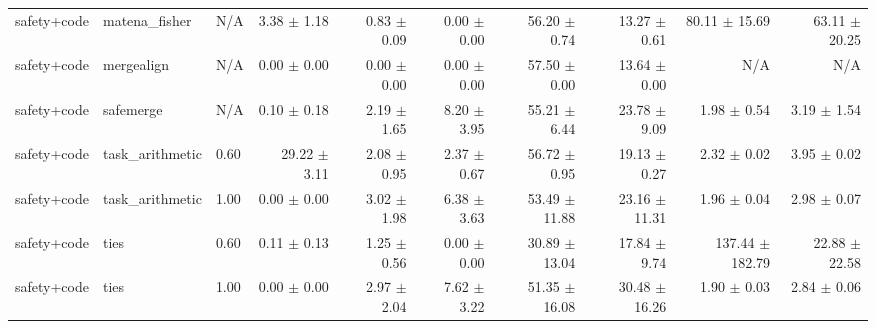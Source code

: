 \documentclass{article}
\begin{document}
\begin{table}[H]
{\begin{tabular}{lllrrrrrrr}
safety+code & matena\_fisher & N/A & 3.38 $\pm$ 1.18 & 0.83 $\pm$ 0.09 & 0.00 $\pm$ 0.00 & 56.20 $\pm$ 0.74 & 13.27 $\pm$ 0.61 & 80.11 $\pm$ 15.69 & 63.11 $\pm$ 20.25 \\
safety+code & mergealign & N/A & 0.00 $\pm$ 0.00 & 0.00 $\pm$ 0.00 & 0.00 $\pm$ 0.00 & 57.50 $\pm$ 0.00 & 13.64 $\pm$ 0.00 & N/A & N/A \\
safety+code & safemerge & N/A & 0.10 $\pm$ 0.18 & 2.19 $\pm$ 1.65 & 8.20 $\pm$ 3.95 & 55.21 $\pm$ 6.44 & 23.78 $\pm$ 9.09 & 1.98 $\pm$ 0.54 & 3.19 $\pm$ 1.54 \\
safety+code & task\_arithmetic & 0.60 & 29.22 $\pm$ 3.11 & 2.08 $\pm$ 0.95 & 2.37 $\pm$ 0.67 & 56.72 $\pm$ 0.95 & 19.13 $\pm$ 0.27 & 2.32 $\pm$ 0.02 & 3.95 $\pm$ 0.02 \\
safety+code & task\_arithmetic & 1.00 & 0.00 $\pm$ 0.00 & 3.02 $\pm$ 1.98 & 6.38 $\pm$ 3.63 & 53.49 $\pm$ 11.88 & 23.16 $\pm$ 11.31 & 1.96 $\pm$ 0.04 & 2.98 $\pm$ 0.07 \\
safety+code & ties & 0.60 & 0.11 $\pm$ 0.13 & 1.25 $\pm$ 0.56 & 0.00 $\pm$ 0.00 & 30.89 $\pm$ 13.04 & 17.84 $\pm$ 9.74 & 137.44 $\pm$ 182.79 & 22.88 $\pm$ 22.58 \\
safety+code & ties & 1.00 & 0.00 $\pm$ 0.00 & 2.97 $\pm$ 2.04 & 7.62 $\pm$ 3.22 & 51.35 $\pm$ 16.08 & 30.48 $\pm$ 16.26 & 1.90 $\pm$ 0.03 & 2.84 $\pm$ 0.06 \\
\bottomrule
\end{tabular}
}
\end{table}


\begin{table}[H]
\centering
\caption{メイン実験 シード別詳細 - Method: dare, Pattern: safety+code}
\label{tab:main_seeds_dare_safety_code}
\small
{}
\end{table}
\end{document}
